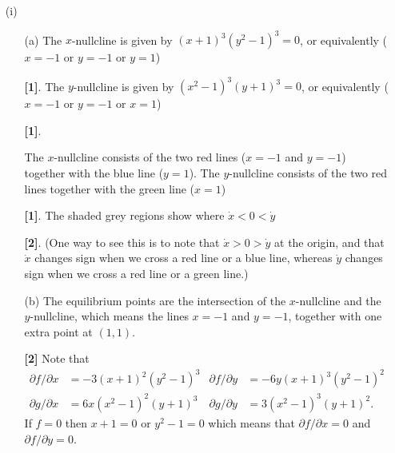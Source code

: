 \documentclass[a4paper]{article}
\newcounter{probcounter}
\newcounter{marksawarded}
\newcommand{\mks}[1]{%
\addtocounter{marksawarded}{#1}%
\textbf{\color{red}[#1]}}
\newcommand{\mk}{\mks{1}}
\newenvironment{solution}{\comment}{\endcomment}
\newenvironment{solution}{
{\bigskip\par\noindent \bf Solution:}}{
\newpage
\typeout{Q\arabic{probcounter}: \arabic{marksawarded} marks awarded}
}
\begin{document}
\begin{solution}
 \begin{itemize}
  \item[(i)] 
   \begin{itemize}
    \item[(a)] The $x$-nullcline is given by $(x+1)^3(y^2-1)^3=0$, or
     equivalently ($x=-1$ or $y=-1$ or $y=1$) \mk.  The $y$-nullcline is
     given by $(x^2-1)^3(y+1)^3=0$, or equivalently ($x=-1$ or $y=-1$
     or $x=1$) \mk.  
     \begin{center}
     \end{center}
     The $x$-nullcline consists of the two red lines ($x=-1$ and
     $y=-1$) together with the blue line ($y=1$).  The $y$-nullcline
     consists of the two red lines together with the green line
     ($x=1$) \mk.  The shaded grey regions show where
     $\dot{x}<0<\dot{y}$ \mks{2}.  (One way to see this is to note that
     $\dot{x}>0>\dot{y}$ at the origin, and that $\dot{x}$ changes
     sign when we cross a red line or a blue line, whereas $\dot{y}$
     changes sign when we cross a red line or a green line.)
    \item[(b)] The equilibrium points are the intersection of the
     $x$-nullcline and the $y$-nullcline, which means the lines $x=-1$
     and $y=-1$, together with one extra point at $(1,1)$.  \mks{2} Note that 
     \begin{align*}
      \partial f/\partial x &= -3(x+1)^2(y^2-1)^3 &
      \partial f/\partial y &= -6y(x+1)^3(y^2-1)^2 \\
      \partial g/\partial x &= 6x(x^2-1)^2(y+1)^3 &
      \partial g/\partial y &= 3(x^2-1)^3(y+1)^2.
     \end{align*}
     If $f=0$ then $x+1=0$ or $y^2-1=0$ which means that
     $\partial f/\partial x=0$ and $\partial f/\partial y=0$.

\end{itemize}
\end{itemize}
\end{solution}
\end{document}
